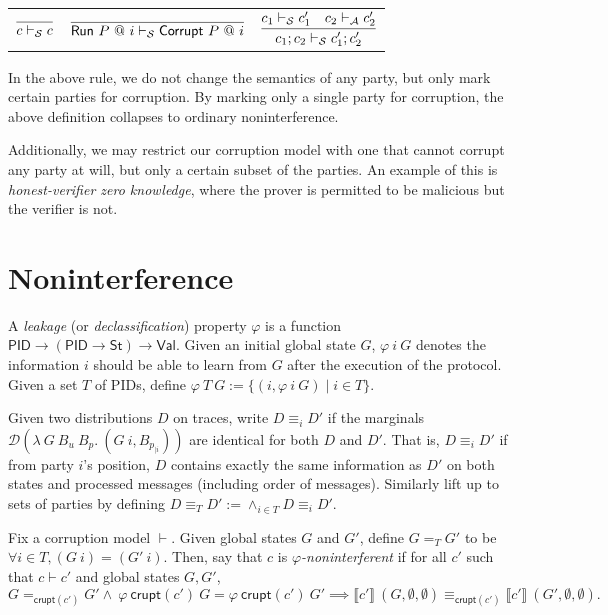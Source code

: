\documentclass{article}
\newcommand{\Val}{\mathsf{Val}}
\newcommand{\St}{\mathsf{St}}
\newcommand{\PID}{\mathsf{PID}}
\begin{document}
\begin{tabular}{ccc}
    $\infer{c \vdash_{\mathcal{S}} c}{}$ & 
    $\infer{\textsf{Run}\ P\ @\ i \vdash_{\mathcal{S}} \textsf{Corrupt}\ P\ @\ i}{}$ &
    $\infer{c_1;c_2 \vdash_{\mathcal{S}} c_1'; c_2'} {c_1 \vdash_\mathcal{S} c_1' & c_2 \vdash_\mathcal{A} c_2'}$ \\
\end{tabular}

In the above rule, we do not change the semantics of any party, but only mark certain parties for corruption. By marking only a single party for corruption, the above definition collapses to ordinary noninterference.

Additionally, we may restrict our corruption model with one that cannot corrupt any party at will, but only a certain subset of the parties. An example of this is \emph{honest-verifier zero knowledge}, where the prover is permitted to be malicious but the verifier is not.

\section{Noninterference}

A \emph{leakage} (or \emph{declassification}) property $\varphi$ is a function $\PID \to (\PID \to \St) \to \Val$. Given an initial global state $G$, $\varphi\ i\ G$ denotes the information $i$ should be able to learn from $G$ after the execution of the protocol. Given a set $T$ of PIDs, define $\varphi\ T\ G := \{(i, \varphi\ i\ G) \mid i \in T\}$.

Given two distributions $D$ on traces, write $D \equiv_i D'$ if the marginals $\mathcal{D} (\lambda\ G\ B_u\ B_p.\ (G\ i, B_{p_{| i}}))$ are identical for both $D$ and $D'$. That is, $D \equiv_i D'$ if from party $i$'s position, $D$ contains exactly the same information as $D'$ on both states and processed messages (including order of messages). Similarly lift up to sets of parties by defining $D \equiv_T D' := \wedge_{i \in T} D \equiv_i D'$.


Fix a corruption model $\vdash$. Given global states $G$ and $G'$, define $G =_T G'$ to be $\forall i \in T, (G\ i) = (G'\ i).$ Then, say that $c$ is \emph{$\varphi$-noninterferent} if for all $c'$ such that $c \vdash c'$ and global states $G, G'$, 
\[ G=_{\mathsf{crupt}(c')}G' \wedge\ \varphi\ \mathsf{crupt}(c')\ G = \varphi\ \mathsf{crupt}(c')\ G' \implies \llbracket c' \rrbracket\ (G, \emptyset, \emptyset) \equiv_{\mathsf{crupt}(c')} \llbracket c' \rrbracket\ (G', \emptyset, \emptyset).\]
\end{document}

